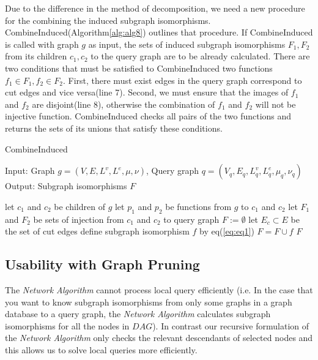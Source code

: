 Due to the difference in the method of decomposition, we need a new procedure for the combining the induced subgraph isomorphisms. 
CombineInduced(Algorithm\ref{alg:alg8}) outlines that procedure.
If CombineInduced is called with graph $g$ as input, the sets of induced subgraph isomorphisms $F_1, F_2$ from its children $c_1, c_2$ to the query graph are to be already calculated.
There are two conditions that must be satisfied to CombineInduced two functions $f_1 \in F_1, f_2 \in F_2$.
First, there must exist edges in the query graph correspond to cut edges and vice versa(line 7).
Second, we must ensure that the images of $f_1$ and $f_2$ are disjoint(line 8), otherwise the combination of $f_1$ and $f_2$ will not be injective function.
CombineInduced checks all pairs of the two functions and returns the sets of its unions that satisfy these conditions.

\begin{algorithm}[t]
\caption{CombineInduced}
\label{alg:alg8}
\begin{algorithmic}
\STATE Input: Graph $g=(V,E,L^v ,L^e ,\mu,\nu)$, Query graph $q=(V_q,E_q,L_q^v ,L_q^e ,\mu_q,\nu_q)$ 
\STATE Output: Subgraph isomorphisms $F$
\end{algorithmic}
\begin{algorithmic}[1]
\STATE let $c_1$ and $c_2$ be children of $g$
\STATE let $p_1$ and $p_2$ be functions from $g$ to $c_1$ and $c_2$
\STATE let $F_1$ and $F_2$ be sets of injection from $c_1$ and $c_2$ to query graph
\STATE $F := \emptyset$
\STATE let $E_c \subset E$ be the set of cut edges
				\STATE define subgraph isomorphism $f$ by eq(\ref{eq:eq1})
				\STATE $F = F \cup f $
		\ENDIF
	\ENDIF
\ENDFOR
\RETURN $F$
\end{algorithmic}
\end{algorithm}

\subsection{Usability with Graph Pruning}
The \textit{Network Algorithm}  cannot process local query efficiently (i.e. In the case that you want to know subgraph isomorphisms from only some graphs in a graph database to a query graph, the \textit{Network Algorithm} calculates subgraph isomorphisms for all the nodes in $DAG$).
In contrast our recursive formulation of the \textit{Network Algorithm} only checks the relevant descendants of selected nodes and this allows us to solve local queries more efficiently.

